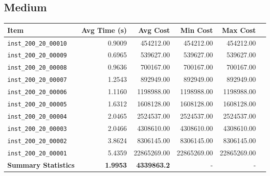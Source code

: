\documentclass{article}
\begin{document}
\subsection*{Medium}
\begin{table}[H]
 	 \centering 
     \hspace*{-1cm}
 	 \begin{tabular}{lrrrrr} 
 	 	\toprule 
 	 	\textbf{Item} & \textbf{Avg Time (s)} & \textbf{Avg Cost} & \textbf{Min Cost} & \textbf{Max Cost} \\ 
 	 	\midrule 
 	 	\texttt{inst\_200\_20\_00010} & 0.9009 & 454212.00 & 454212.00 & 454212.00  \\ \texttt{inst\_200\_20\_00009} & 0.6965 & 539627.00 & 539627.00 & 539627.00 \\ \texttt{inst\_200\_20\_00008} & 0.9636 & 700167.00 & 700167.00 & 700167.00 \\  \texttt{inst\_200\_20\_00007} & 1.2543 & 892949.00 & 892949.00 & 892949.00 \\  \texttt{inst\_200\_20\_00006} & 1.1160 & 1198988.00 & 1198988.00 & 1198988.00 \\  \texttt{inst\_200\_20\_00005} & 1.6312 & 1608128.00 & 1608128.00 & 1608128.00 \\  \texttt{inst\_200\_20\_00004} & 2.0465 & 2524537.00 & 2524537.00 & 2524537.00 \\  \texttt{inst\_200\_20\_00003} & 2.0466 & 4308610.00 & 4308610.00 & 4308610.00 \\  \texttt{inst\_200\_20\_00002} & 3.8624 & 8306145.00 & 8306145.00 & 8306145.00 \\  \texttt{inst\_200\_20\_00001} & 5.4359 & 22865269.00 & 22865269.00 & 22865269.00 \\ 
 	 	\midrule 
 	 	\textbf{Summary Statistics} & \textbf{1.9953} & \textbf{4339863.2} & - & - \\ 
 	 	\bottomrule
 	  \end{tabular}
 	  \label{tab:performance_metrics_medium_vnd}
\end{table}
\end{document}
